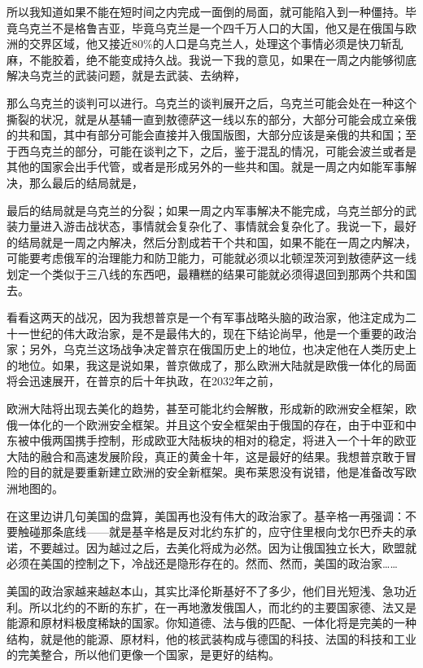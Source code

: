 \documentclass[UTF8, 12pt, a4paper]{ctexrep}
\begin{document}
所以我知道如果不能在短时间之内完成一面倒的局面，就可能陷入到一种僵持。毕竟乌克兰不是格鲁吉亚，毕竟乌克兰是一个四千万人口的大国，他又是在俄国与欧洲的交界区域，他又接近80\%的人口是乌克兰人，处理这个事情必须是快刀斩乱麻，不能胶着，绝不能变成持久战。我说一下我的意见，如果在一周之内能够彻底解决乌克兰的武装问题，就是去武装、去纳粹，

那么乌克兰的谈判可以进行。乌克兰的谈判展开之后，乌克兰可能会处在一种这个撕裂的状况，就是从基辅一直到敖德萨这一线以东的部分，大部分可能会成立亲俄的共和国，其中有部分可能会直接并入俄国版图，大部分应该是亲俄的共和国；至于西乌克兰的部分，可能在谈判之下，之后，鉴于混乱的情况，可能会波兰或者是其他的国家会出手代管，或者是形成另外的一些共和国。就是一周之内如能军事解决，那么最后的结局就是，

最后的结局就是乌克兰的分裂；如果一周之内军事解决不能完成，乌克兰部分的武装力量进入游击战状态，事情就会复杂化了、事情就会复杂化了。我说一下，最好的结局就是一周之内解决，然后分割成若干个共和国，如果不能在一周之内解决，可能要考虑俄军的治理能力和防卫能力，可能就必须以北顿涅茨河到敖德萨这一线划定一个类似于三八线的东西吧，最糟糕的结果可能就必须得退回到那两个共和国去。

看看这两天的战况，因为我想普京是一个有军事战略头脑的政治家，他注定成为二十一世纪的伟大政治家，是不是最伟大的，现在下结论尚早，他是一个重要的政治家；另外，乌克兰这场战争决定普京在俄国历史上的地位，也决定他在人类历史上的地位。如果，我这是说如果，普京做成了，那么欧洲大陆就是欧俄一体化的局面将会迅速展开，在普京的后十年执政，在2032年之前，

欧洲大陆将出现去美化的趋势，甚至可能北约会解散，形成新的欧洲安全框架，欧俄一体化的一个欧洲安全框架。并且这个安全框架由于俄国的存在，由于中亚和中东被中俄两国携手控制，形成欧亚大陆板块的相对的稳定，将进入一个十年的欧亚大陆的融合和高速发展阶段，真正的黄金十年，这是最好的结果。我想普京敢于冒险的目的就是要重新建立欧洲的安全新框架。奥布莱恩没有说错，他是准备改写欧洲地图的。

在这里边讲几句美国的盘算，美国再也没有伟大的政治家了。基辛格一再强调：不要触碰那条底线——就是基辛格是反对北约东扩的，应守住里根向戈尔巴乔夫的承诺，不要越过。因为越过之后，去美化将成为必然。因为让俄国独立长大，欧盟就必须在美国的控制之下，冷战还是隐形存在的。然而、然而，美国的政治家……

美国的政治家越来越赵本山，其实比泽伦斯基好不了多少，他们目光短浅、急功近利。所以北约的不断的东扩，在一再地激发俄国人，而北约的主要国家德、法又是能源和原材料极度稀缺的国家。你知道德、法与俄的匹配、一体化将是完美的一种结构，就是他的能源、原材料，他的核武装构成与德国的科技、法国的科技和工业的完美整合，所以他们更像一个国家，是更好的结构。
\end{document}

